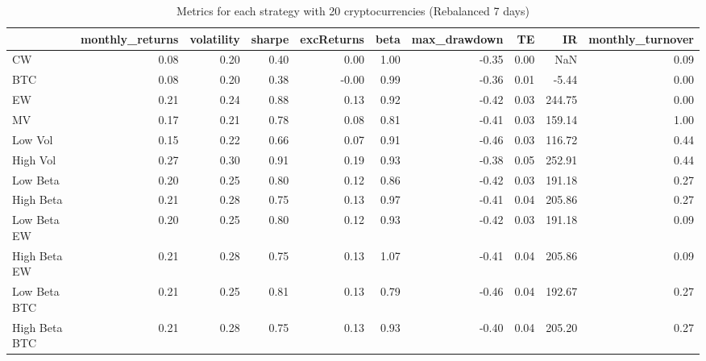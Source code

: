 \begin{table}
\centering
\caption{Metrics for each strategy with 20 cryptocurrencies (Rebalanced 7 days)}
\label{metrics20_7}
\begin{tabular}{lrrrrrrrrr}
\toprule
{} &  monthly\_returns &  volatility &  sharpe &  excReturns &  beta &  max\_drawdown &   TE &     IR &  monthly\_turnover \\
\midrule
CW            &             0.08 &        0.20 &    0.40 &        0.00 &  1.00 &         -0.35 & 0.00 &    NaN &              0.09 \\
BTC           &             0.08 &        0.20 &    0.38 &       -0.00 &  0.99 &         -0.36 & 0.01 &  -5.44 &              0.00 \\
EW            &             0.21 &        0.24 &    0.88 &        0.13 &  0.92 &         -0.42 & 0.03 & 244.75 &              0.00 \\
MV            &             0.17 &        0.21 &    0.78 &        0.08 &  0.81 &         -0.41 & 0.03 & 159.14 &              1.00 \\
Low Vol       &             0.15 &        0.22 &    0.66 &        0.07 &  0.91 &         -0.46 & 0.03 & 116.72 &              0.44 \\
High Vol      &             0.27 &        0.30 &    0.91 &        0.19 &  0.93 &         -0.38 & 0.05 & 252.91 &              0.44 \\
Low Beta      &             0.20 &        0.25 &    0.80 &        0.12 &  0.86 &         -0.42 & 0.03 & 191.18 &              0.27 \\
High Beta     &             0.21 &        0.28 &    0.75 &        0.13 &  0.97 &         -0.41 & 0.04 & 205.86 &              0.27 \\
Low Beta EW   &             0.20 &        0.25 &    0.80 &        0.12 &  0.93 &         -0.42 & 0.03 & 191.18 &              0.09 \\
High Beta EW  &             0.21 &        0.28 &    0.75 &        0.13 &  1.07 &         -0.41 & 0.04 & 205.86 &              0.09 \\
Low Beta BTC  &             0.21 &        0.25 &    0.81 &        0.13 &  0.79 &         -0.46 & 0.04 & 192.67 &              0.27 \\
High Beta BTC &             0.21 &        0.28 &    0.75 &        0.13 &  0.93 &         -0.40 & 0.04 & 205.20 &              0.27 \\
\bottomrule
\end{tabular}
\end{table}
